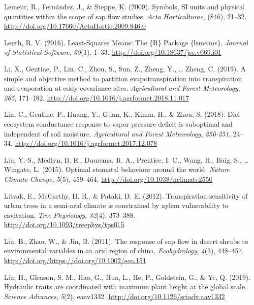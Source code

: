 \documentclass[11pt,twoside]{reedthesis}
\begin{document}
\hypertarget{ref-lemeur2009}{}
Lemeur, R., Fernández, J., \& Steppe, K. (2009). Symbols, SI units and
physical quantities within the scope of sap flow studies. \emph{Acta
Horticulturae}, (846), 21--32.
\url{http://doi.org/10.17660/ActaHortic.2009.846.0}

\hypertarget{ref-Lenth2016}{}
Lenth, R. V. (2016). Least-Squares Means: The \{R\} Package \{lsmeans\}.
\emph{Journal of Statistical Software}, \emph{69}(1), 1--33.
\url{http://doi.org/10.18637/jss.v069.i01}

\hypertarget{ref-li_simple_2019}{}
Li, X., Gentine, P., Lin, C., Zhou, S., Sun, Z., Zheng, Y., \ldots{}
Zheng, C. (2019). A simple and objective method to partition
evapotranspiration into transpiration and evaporation at eddy-covariance
sites. \emph{Agricultural and Forest Meteorology}, \emph{265}, 171--182.
\url{http://doi.org/10.1016/j.agrformet.2018.11.017}

\hypertarget{ref-lin_diel_2018}{}
Lin, C., Gentine, P., Huang, Y., Guan, K., Kimm, H., \& Zhou, S. (2018).
Diel ecosystem conductance response to vapor pressure deficit is
suboptimal and independent of soil moisture. \emph{Agricultural and
Forest Meteorology}, \emph{250-251}, 24--34.
\url{http://doi.org/10.1016/j.agrformet.2017.12.078}

\hypertarget{ref-lin_optimal_2015}{}
Lin, Y.-S., Medlyn, B. E., Duursma, R. A., Prentice, I. C., Wang, H.,
Baig, S., \ldots{} Wingate, L. (2015). Optimal stomatal behaviour around
the world. \emph{Nature Climate Change}, \emph{5}(5), 459--464.
\url{http://doi.org/10.1038/nclimate2550}

\hypertarget{ref-litvak_transpiration_2012}{}
Litvak, E., McCarthy, H. R., \& Pataki, D. E. (2012). Transpiration
sensitivity of urban trees in a semi-arid climate is constrained by
xylem vulnerability to cavitation. \emph{Tree Physiology}, \emph{32}(4),
373--388. \url{http://doi.org/10.1093/treephys/tps015}

\hypertarget{ref-Liu2011}{}
Liu, B., Zhao, W., \& Jin, B. (2011). The response of sap flow in desert
shrubs to environmental variables in an arid region of china.
\emph{Ecohydrology}, \emph{4}(3), 448--457.
\url{http://doi.org/https://doi.org/10.1002/eco.151}

\hypertarget{ref-liu_hydraulic_2019}{}
Liu, H., Gleason, S. M., Hao, G., Hua, L., He, P., Goldstein, G., \& Ye,
Q. (2019). Hydraulic traits are coordinated with maximum plant height at
the global scale. \emph{Science Advances}, \emph{5}(2), eaav1332.
\url{http://doi.org/10.1126/sciadv.aav1332}
\end{document}
